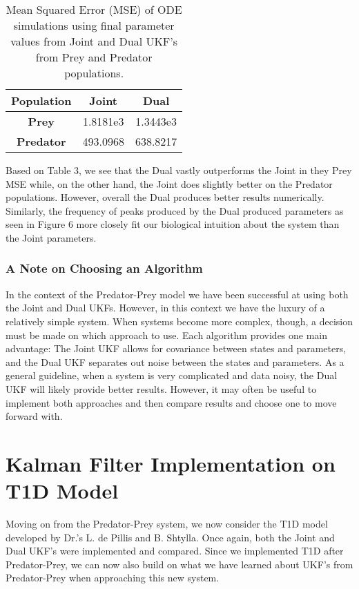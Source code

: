 \begin{table}[H]
  \begin{center}
    \label{tab:table1}
    \begin{tabular}{c|c|c} %
      \textbf{Population} & \textbf{Joint} & \textbf{Dual} \\
      \hline
      \textbf{Prey} & 1.8181e3 & 1.3443e3\\
      \textbf{Predator} & 493.0968 & 638.8217
    \end{tabular}
    \caption{Mean Squared Error (MSE) of ODE simulations using final parameter values from Joint and Dual UKF's from Prey and Predator populations.}
  \end{center}
\end{table}

Based on Table 3, we see that the Dual vastly outperforms the Joint in they Prey MSE while, on the other hand, the Joint does slightly better on the Predator populations. However, overall the Dual produces better results numerically. Similarly, the frequency of peaks produced by the Dual produced parameters as seen in Figure 6 more closely fit our biological intuition about the system than the Joint parameters.


\subsubsection{A Note on Choosing an Algorithm}
In the context of the Predator-Prey model we have been successful at using both the Joint and Dual UKFs. However, in this context we have the luxury of a relatively simple system. When systems become more complex, though, a decision must be made on which approach to use. Each algorithm provides one main advantage: The Joint UKF allows for covariance between states and parameters, and the Dual UKF separates out noise between the states and parameters. As a general guideline, when a system is very complicated and data noisy, the Dual UKF will likely provide better results. However, it may often be useful to implement both approaches and then compare results and choose one to move forward with.
\\



\section{Kalman Filter Implementation on T1D Model}
Moving on from the Predator-Prey system, we now consider the T1D model developed by Dr.'s L. de Pillis and B. Shtylla. Once again, both the Joint and Dual UKF's were implemented and compared. Since we implemented T1D after Predator-Prey, we can now also build on what we have learned about UKF's from Predator-Prey when approaching this new system.

